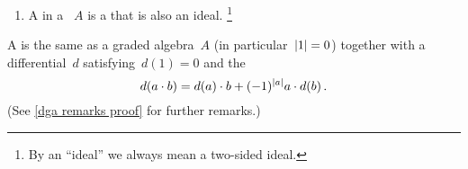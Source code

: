 \documentclass[a4paper,10pt,headings=standardclasses]{scrartcl}
\begin{document}
\begin{definition}
\begin{enumerate}
    \item
      A  in a {\dga}~$A$ is a {\dgsub} that is also an ideal.%
      \footnote{By an \enquote{ideal} we always mean a two-sided ideal.}
  \end{enumerate}
\end{definition}

\begin{remark}
  \label{dga remarks}
  A {\dga} is the same as a graded algebra~$A$ (in particular~$\lvert1\rvert = 0$) together with a differential~$d$ satisfying~$d(1) = 0$ and the 
  \begin{equation}
  \label{compatibility of multiplication with differential}
    d(a \cdot b)
    =
    d(a) \cdot b + (-1)^{\lvert a\rvert} a \cdot d(b) \,.
  \end{equation}
  (See \cref{dga remarks proof} for further remarks.)
\end{remark}
\end{document}
